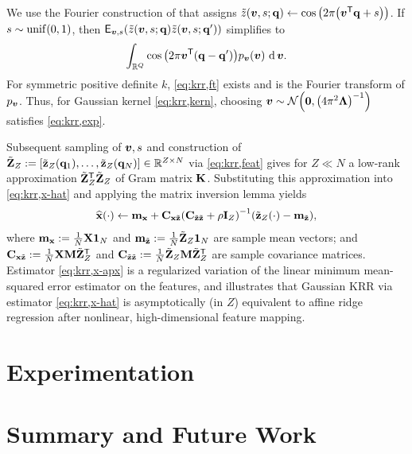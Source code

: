We use the Fourier construction 
of \cite{rahimi:07:rff}
that assigns
$\zt\paren{\bmv,s;\bmq} 
\gets 
\cosa{2\pi\paren{\bmv\tpose \bmq + s}}$.
If $s\sim\unif{0,1}$, 
then 
$\expect{\bmv,s}{
		\zt\paren{\bmv,s;\bmq}
		\zt\paren{\bmv,s;\bmq'} 
}$
simplifies to
\begin{align}
	\int_{\reals{Q}} \cosa{2\pi\bmv\tpose\paren{\bmq-\bmq'}} \dist{\bmv}\paren{\bmv} \der{\bmv}.
	\label{eq:krr,ft}
\end{align}
For symmetric positive definite $k$,
\eqref{eq:krr,ft} exists \cite{wu:97:gbt} 
and is the Fourier transform 
of $p_{\boldsymbol{v}}$.
Thus, for Gaussian kernel \eqref{eq:krr,kern},
choosing $\bmv\sim\gauss{\boldsymbol{0}}{\inv{4\pi^2\bmL}}$
satisfies \eqref{eq:krr,exp}.

Subsequent sampling of $\boldsymbol{v},s$ 
and construction of 
$\bmZt := \brac{\bmztZa{\bmq_1},\dots,\bmztZa{\bmq_N}} \in \reals{Z \times N}$
via \eqref{eq:krr,feat}
gives for $Z \ll N$
a low-rank approximation $\tilde{\mathbf{Z}}_Z^{\mathsf{T}}\tilde{\mathbf{Z}}_Z$ 
of Gram matrix $\mathbf{K}$.
Substituting this approximation into \eqref{eq:krr,x-hat}
and applying the matrix inversion lemma \cite{woodbury:50:imm} 
yields
\begin{align}
	\esta{\bmx}{\cdot} \gets \bmmx + \Cxzt\inv{\Cztzt + \rho\eye{Z}} \paren{\bmztZa{\cdot} - \bmmzt},
	\label{eq:krr,x-apx}
\end{align}
where $\mathbf{m}_{\mathbf{x}} := \frac{1}{N}\mathbf{X}\boldsymbol{1}_{N}$ 
and $\mathbf{m}_{\tilde{\mathbf{z}}} := \frac{1}{N}\tilde{\mathbf{Z}}_Z\boldsymbol{1}_{N}$ 
are sample mean vectors; and
$\mathbf{C}_{\mathbf{x}\tilde{\mathbf{z}}} := \frac{1}{N}\mathbf{X}\mathbf{M}\tilde{\mathbf{Z}}_Z^{\mathsf{T}}$
and $\mathbf{C}_{\tilde{\mathbf{z}}\tilde{\mathbf{z}}} := \frac{1}{N}\tilde{\mathbf{Z}}_Z\mathbf{M}\tilde{\mathbf{Z}}_Z^{\mathsf{T}}$ 
are sample covariance matrices.
Estimator \eqref{eq:krr,x-apx} 
is a regularized variation
of the linear minimum mean-squared error estimator
on the features,
and illustrates
that Gaussian KRR via estimator \eqref{eq:krr,x-hat}
is asymptotically (in $Z$) equivalent
to affine ridge regression
after nonlinear, high-dimensional feature mapping.

\section{Experimentation}
\label{s,krr,exp}

\section{Summary and Future Work}
\label{s,krr,summ}



